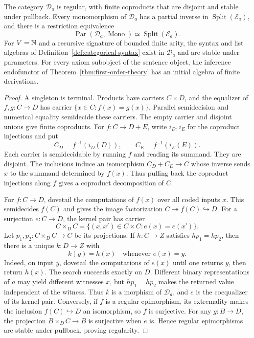 \begin{proposition}\label{prop:miller-theory-realization}
The category $\mathcal D_a$ is regular, with finite coproducts that
are disjoint and stable under pullback. Every monomorphism of
$\mathcal D_a$ has a partial inverse in
$\operatorname{Split}(\mathcal E_a)$, and there is a restriction equivalence
\[
 \operatorname{Par}(\mathcal D_a,\operatorname{Mono})
       \simeq\operatorname{Split}(\mathcal E_a).
\]
For $V=\mathbb N$ and a recursive signature of bounded finite arity, the
syntax and list algebras of Definition~\ref{def:categorical-syntax}
exist in $\mathcal D_a$ and are stable under parameters.
For every axiom subobject of the sentence object, the inference
endofunctor of Theorem~\ref{thm:first-order-theory} has an initial
algebra of finite derivations.
\end{proposition}
\begin{proof}
A singleton is terminal. Products have carriers $C\times D$, and the
equalizer of $f,g:C\to D$ has carrier $\{x\in C:f(x)=g(x)\}$.
Parallel semidecision and numerical equality semidecide these carriers.
The empty carrier and disjoint unions give finite coproducts.
For $f:C\to D+E$, write $i_D,i_E$ for the coproduct injections and put
\[
 C_D=f^{-1}(i_D(D)),\qquad C_E=f^{-1}(i_E(E)).
\]
Each carrier is semidecidable by running $f$ and reading its summand.
They are disjoint. The inclusions induce an isomorphism
$C_D+C_E\to C$ whose inverse sends $x$ to the summand determined by
$f(x)$. Thus pulling back the coproduct injections along $f$ gives a
coproduct decomposition of $C$.

For $f:C\to D$, dovetail the computations of $f(x)$ over all coded
inputs $x$. This semidecides $f(C)$ and gives the image factorization
$C\twoheadrightarrow f(C)\hookrightarrow D$. For a surjection
$e:C\to D$, the kernel pair has carrier
\[
 C\times_D C=\{(x,x')\in C\times C:e(x)=e(x')\}.
\]
Let $p_1,p_2:C\times_D C\to C$ be its projections. If $h:C\to Z$
satisfies $hp_1=hp_2$, then there is a unique $k:D\to Z$ with
\[
 k(y)=h(x)\quad\text{whenever } e(x)=y.
\]
Indeed, on input $y$, dovetail the computations of $e(x)$ until one
returns $y$, then return $h(x)$. The search succeeds exactly on $D$.
Different binary representations of $a$ may yield different witnesses
$x$, but $hp_1=hp_2$ makes the returned value independent of the
witness. Thus $k$ is a morphism of $\mathcal D_a$, and $e$ is the coequalizer
of its kernel pair. Conversely, if $f$ is a regular epimorphism, its
extremality makes the inclusion $f(C)\hookrightarrow D$ an
isomorphism, so $f$ is surjective. For any $g:B\to D$, the projection
$B\times_D C\to B$ is surjective when $e$ is. Hence regular
epimorphisms are stable under pullback, proving regularity.


\end{proof}
